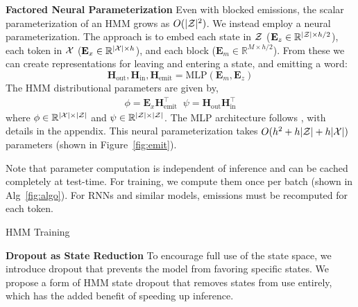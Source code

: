 \documentclass[11pt,a4paper]{article}
\begin{document}
\vspace{0.2cm}

\noindent
\textbf{Factored Neural Parameterization}
Even with blocked emissions, the scalar parameterization of an HMM grows as $O(|\mathcal{Z}|^2)$.
We instead employ a neural parameterization.
The approach is to embed each state in $\mathcal{Z}$ ($\mathbf{E}_z \in \mathbb{R}^{|\mathcal{Z}| \times h/2}$),
each token in $\cal X$ ($\mathbf{E}_x \in \mathbb{R}^{|\mathcal{X}| \times h}$),
and each block ($\mathbf{E}_m \in \mathbb{R}^{M \times h/2}$).
From these we can create representations for leaving and entering a state,
and emitting a word: 
\[ \mathbf{H}_{\textrm{out}},\mathbf{H}_{\textrm{in}},\mathbf{H}_\textrm{emit}
 = \text{MLP}(\mathbf{E}_m, \mathbf{E}_z ) \] 
The HMM distributional parameters are given by,
\begin{equation}
\begin{aligned}
\phi = \mathbf{E}_x \mathbf{H}_\textrm{emit}^\top \;\; 
\psi = \mathbf{H}_\textrm{out} \mathbf{H}_\textrm{in}^\top
\end{aligned}
\end{equation}
where $\phi \in \mathbb{R}^{|\mathcal{X}|\times|\mathcal{Z}|}$ and
$\psi \in \mathbb{R}^{|\mathcal{Z}|\times|\mathcal{Z}|}$.
The MLP architecture follows \cite{kim2019cpcfg}, with details in the appendix.
This neural parameterization takes $O(h^2 + h|\mathcal{Z}| + h|\mathcal{X}|)$ parameters
(shown in Figure~\ref{fig:emit}).

Note that parameter computation is independent of inference
and can be cached completely at test-time.
For training, we compute them once per batch (shown in Alg~\ref{fig:algo}). 
For RNNs and similar models, %
emissions must be recomputed for each token. 


\begin{algorithm}[t]
\begin{algorithmic}
    \EndFor
\end{algorithmic}
\caption{
\label{fig:algo}
HMM Training
}
\end{algorithm}

\vspace{0.2cm}

\noindent
\textbf{Dropout as State Reduction}
To encourage full use of the state space,
we introduce dropout that prevents the model from favoring specific states. 
We propose a form of HMM state dropout that removes states from use entirely,
which has the added benefit of speeding up inference.
\end{document}
